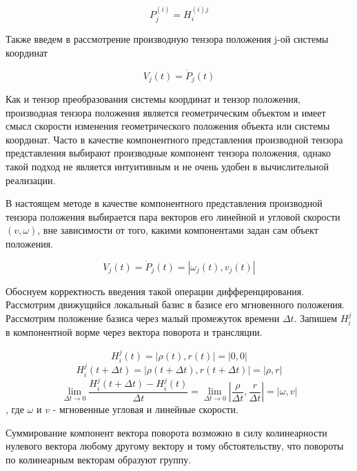 \begin{equation}
P_j^{(i)} = H_{i}^{(i)j}
\end{equation}

Также введем в рассмотрение производную тензора положения j-ой системы координат

\begin{equation}\label{speed_eq} 
V_j(t) = \dot{P}_j(t) 
\end{equation}

Как и тензор преобразования системы координат и тензор положения, производная тензора положения является геометрическим объектом и имеет смысл скорости изменения геометрического положения объекта или системы координат. Часто в качестве компонентного представления производной тензора представления выбирают производные компонент тензора положения, однако такой подход не является интуитивным и не очень удобен в вычислительной реализации.

В настоящем методе в качестве компонентного представления производной тензора положения выбирается пара векторов его линейной и угловой скорости $(v,\omega)$, вне зависимости от того, какими компонентами задан сам объект положения.

\begin{equation}\label{speed_eq_comp} 
V_j(t) = \dot{P}_j(t) = |\omega_j(t),v_j(t)|
\end{equation} 

Обоснуем корректность введения такой операции дифференцирования. Рассмотрим движущийся локальный базис в базисе его мгновенного положения. Рассмотрим положение базиса через малый промежуток времени $\Delta t$. Запишем $H^j_i$ в компонентной ворме через вектора поворота и трансляции.

\begin{equation}H^j_i(t) = |\rho(t), r(t)| = |0, 0|\end{equation} 
\begin{equation}H^j_i(t+\Delta t) = |\rho(t + \Delta t), r(t + \Delta t)| = |\rho, r|\end{equation} 
\begin{equation}\lim_{\Delta t \to 0}\frac{H^j_i(t+\Delta t) - H^j_i(t)}{\Delta t} = \lim_{\Delta t \to 0}|\frac{\rho}{\Delta t}, \frac{r}{\Delta t}| = |\omega, v|\end{equation} , где $\omega$ и $v$ - мгновенные угловая и линейные скорости.

Суммирование компонент вектора поворота возможно в силу колинеарности нулевого вектора любому другому вектору и тому обстоятельству, что повороты по колинеарным векторам образуют группу.

